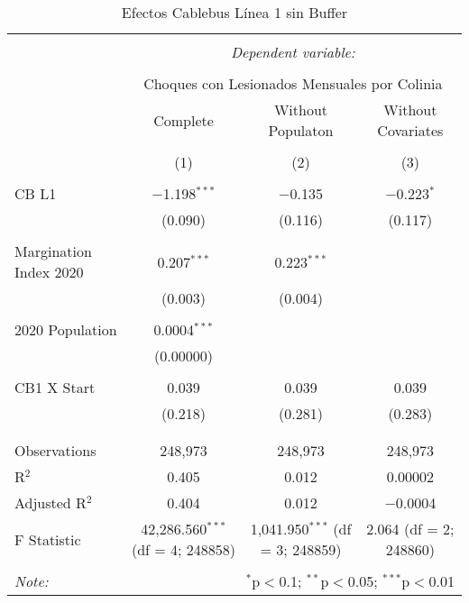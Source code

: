 
\begin{table}[!htbp] \centering 
  \caption{Efectos Cablebus Línea 1 sin Buffer} 
  \label{} 
\begin{tabular}{@{\extracolsep{5pt}}lccc} 
\\[-1.8ex]\hline 
\hline \\[-1.8ex] 
 & \multicolumn{3}{c}{\textit{Dependent variable:}} \\ 
\cline{2-4} 
\\[-1.8ex] & \multicolumn{3}{c}{Choques con Lesionados Mensuales por Colinia} \\ 
 & Complete & Without Populaton & Without Covariates \\ 
\\[-1.8ex] & (1) & (2) & (3)\\ 
\hline \\[-1.8ex] 
 CB L1 & $-$1.198$^{***}$ & $-$0.135 & $-$0.223$^{*}$ \\ 
  & (0.090) & (0.116) & (0.117) \\ 
  & & & \\ 
 Margination Index 2020 & 0.207$^{***}$ & 0.223$^{***}$ &  \\ 
  & (0.003) & (0.004) &  \\ 
  & & & \\ 
 2020 Population & 0.0004$^{***}$ &  &  \\ 
  & (0.00000) &  &  \\ 
  & & & \\ 
 CB1 X Start & 0.039 & 0.039 & 0.039 \\ 
  & (0.218) & (0.281) & (0.283) \\ 
  & & & \\ 
\hline \\[-1.8ex] 
Observations & 248,973 & 248,973 & 248,973 \\ 
R$^{2}$ & 0.405 & 0.012 & 0.00002 \\ 
Adjusted R$^{2}$ & 0.404 & 0.012 & $-$0.0004 \\ 
F Statistic & 42,286.560$^{***}$ (df = 4; 248858) & 1,041.950$^{***}$ (df = 3; 248859) & 2.064 (df = 2; 248860) \\ 
\hline 
\hline \\[-1.8ex] 
\textit{Note:}  & \multicolumn{3}{r}{$^{*}$p$<$0.1; $^{**}$p$<$0.05; $^{***}$p$<$0.01} \\ 
\end{tabular} 
\end{table} 
